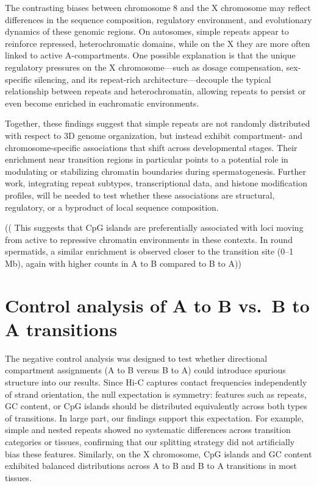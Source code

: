 \documentclass[
  a4paper,
  openany]{scrbook}
\begin{document}
The contrasting biases between chromosome 8 and the X chromosome may
reflect differences in the sequence composition, regulatory environment,
and evolutionary dynamics of these genomic regions. On autosomes, simple
repeats appear to reinforce repressed, heterochromatic domains, while on
the X they are more often linked to active A-compartments. One possible
explanation is that the unique regulatory pressures on the X
chromosome---such as dosage compensation, sex-specific silencing, and
its repeat-rich architecture---decouple the typical relationship between
repeats and heterochromatin, allowing repeats to persist or even become
enriched in euchromatic environments.

Together, these findings suggest that simple repeats are not randomly
distributed with respect to 3D genome organization, but instead exhibit
compartment- and chromosome-specific associations that shift across
developmental stages. Their enrichment near transition regions in
particular points to a potential role in modulating or stabilizing
chromatin boundaries during spermatogenesis. Further work, integrating
repeat subtypes, transcriptional data, and histone modification
profiles, will be needed to test whether these associations are
structural, regulatory, or a byproduct of local sequence composition.

(( This suggests that CpG islands are preferentially associated with
loci moving from active to repressive chromatin environments in these
contexts. In round spermatids, a similar enrichment is observed closer
to the transition site (0--1 Mb), again with higher counts in A to B
compared to B to A))

\section{Control analysis of A to B vs.~B to A
transitions}\label{control-analysis-of-a-to-b-vs.-b-to-a-transitions}

The negative control analysis was designed to test whether directional
compartment assignments (A to B versus B to A) could introduce spurious
structure into our results. Since Hi-C captures contact frequencies
independently of strand orientation, the null expectation is symmetry:
features such as repeats, GC content, or CpG islands should be
distributed equivalently across both types of transitions. In large
part, our findings support this expectation. For example, simple and
nested repeats showed no systematic differences across transition
categories or tissues, confirming that our splitting strategy did not
artificially bias these features. Similarly, on the X chromosome, CpG
islands and GC content exhibited balanced distributions across A to B
and B to A transitions in most tissues.
\end{document}
